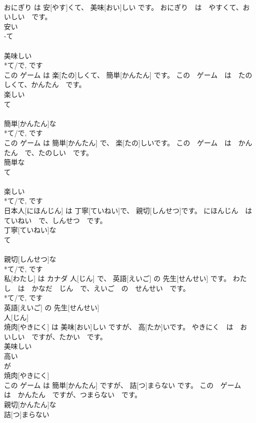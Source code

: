 \documentclass[8pt]{extreport}
\begin{document}
\begin{CJK}{UTF8}{min}
\\	おにぎり は 安[やす]くて、 美味[おい]しい です。	おにぎり　は　やすくて、おいしい　です。	
\\	安い 
\\	-て 
\\	[い] 
\\	[くて]	美味しい 
\\	*て/で, です 
\\	この ゲーム は 楽[たの]しくて、 簡単[かんたん] です。	この　ゲーム　は　たのしくて、かんたん　です。	
\\	楽しい 
\\	て 
\\	[い] 
\\	[くて]	簡単[かんたん]な 
\\	*て/で, です 
\\	この ゲーム は 簡単[かんたん] で、 楽[たの]しいです。	この　ゲーム　は　かんたん　で、たのしい　です。	
\\	簡単な 
\\	て 
\\	[な] 
\\	[で]	楽しい 
\\	*て/で, です 
\\	日本人[にほんじん] は 丁寧[ていねい]で、 親切[しんせつ]です。	にほんじん　は　ていねい　で、しんせつ　です。	
\\	丁寧[ていねい]な 
\\	て 
\\	[な] 
\\	[で]	親切[しんせつ]な 
\\	*て/で, です 
\\	私[わたし] は カナダ 人[じん] で、 英語[えいご] の 先生[せんせい] です。	わたし　は　かなだ　じん　で、えいご　の　せんせい　です。	
\\	*て/で, です 
\\	英語[えいご] の 先生[せんせい] 
\\	人[じん] 
\\	焼肉[やきにく] は 美味[おい]しい ですが、 高[たか]いです。	やきにく　は　おいしい　ですが、たかい　です。	
\\	美味しい 
\\	高い 
\\	が 
\\	焼肉[やきにく] 
\\	この ゲーム は 簡単[かんたん] ですが、 詰[つ]まらない です。	この　ゲーム　は　かんたん　ですが、つまらない　です。	
\\	親切[かんたん]な 
\\	詰[つ]まらない 

\end{CJK}
\end{document}
